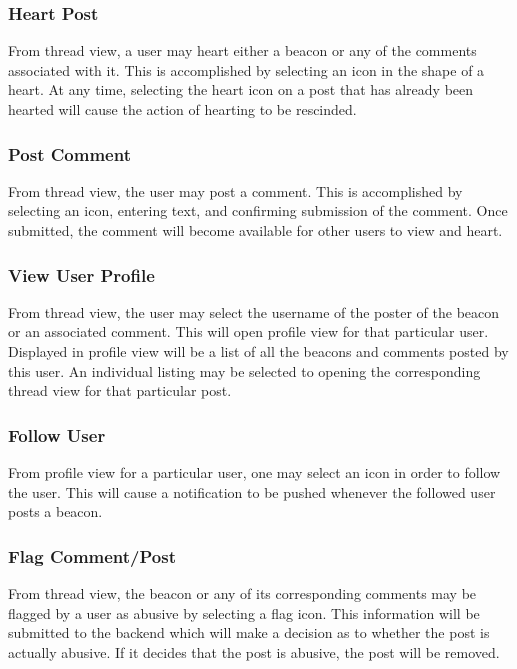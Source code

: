         \subsubsection{Heart Post}
           From thread view, a user may heart either a beacon or any of the comments
           associated with it. This is accomplished by selecting an icon in the shape
           of a heart. At any time, selecting the heart icon on a post that has already
           been hearted will cause the action of hearting to be rescinded.

        \subsubsection{Post Comment}
           From thread view, the user may post a comment. This is accomplished by
           selecting an icon, entering text, and confirming submission of the comment.
           Once submitted, the comment will become available for other users to view
           and heart.

        \subsubsection{View User Profile}
           From thread view, the user may select the username of the poster of the
           beacon or an associated comment. This will open profile view for that
           particular user. Displayed in profile view will be a list of all the beacons
           and comments posted by this user. An individual listing may be selected to
           opening the corresponding thread view for that particular post.

        \subsubsection{Follow User}
           From profile view for a particular user, one may select an icon in order
           to follow the user. This will cause a notification to be pushed whenever
           the followed user posts a beacon.

        \subsubsection{Flag Comment/Post}
            From thread view, the beacon or any of its corresponding comments may be
            flagged by a user as abusive by selecting a flag icon. This information
            will be submitted to the backend which will make a decision as to whether
            the post is actually abusive. If it decides that the post is abusive, the
            post will be removed.

